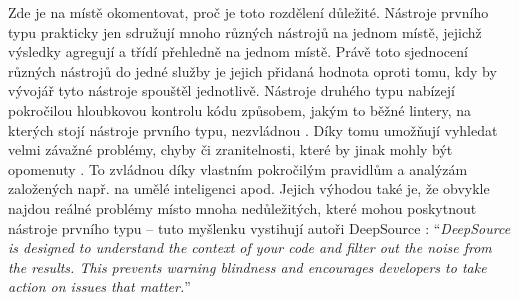 Zde je na místě okomentovat, proč je toto rozdělení důležité. Nástroje prvního typu prakticky jen sdružují mnoho různých nástrojů na jednom místě, jejichž výsledky agregují a třídí přehledně na jednom místě. Právě toto sjednocení různých nástrojů do jedné služby je jejich přidaná hodnota oproti tomu, kdy by vývojář tyto nástroje spouštěl jednotlivě. Nástroje druhého typu nabízejí pokročilou hloubkovou kontrolu kódu způsobem, jakým to běžné lintery, na kterých stojí nástroje prvního typu, nezvládnou \cite{deepscan-lintercompare}. Díky tomu umožňují vyhledat velmi závažné problémy, chyby či zranitelnosti, které by jinak mohly být opomenuty \cite{deepscan-lintercompare, deepsource2}. To zvládnou díky vlastním pokročilým pravidlům a analýzám založených např. na umělé inteligenci \cite{deepsource2} apod. Jejich výhodou také je, že obvykle najdou reálné problémy místo mnoha nedůležitých, které mohou poskytnout nástroje prvního typu -- tuto myšlenku vystihují autoři DeepSource \cite{deepsource2}: \enquote{\textit{DeepSource is designed to understand the context of your code and filter out the noise from the results. This prevents warning blindness and encourages developers to take action on issues that matter.}}

